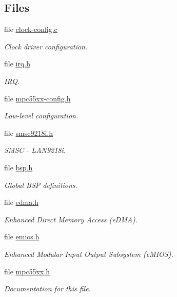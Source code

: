 \subsection*{Files}
\begin{DoxyCompactItemize}
\item 
file \mbox{\hyperlink{mpc55xxevb_2clock_2clock-config_8c}{clock-\/config.\+c}}
\begin{DoxyCompactList}\small\item\em Clock driver configuration. \end{DoxyCompactList}\item 
file \mbox{\hyperlink{bsps_2powerpc_2mpc55xxevb_2include_2bsp_2irq_8h}{irq.\+h}}
\begin{DoxyCompactList}\small\item\em I\+RQ. \end{DoxyCompactList}\item 
file \mbox{\hyperlink{mpc55xx-config_8h}{mpc55xx-\/config.\+h}}
\begin{DoxyCompactList}\small\item\em Low-\/level configuration. \end{DoxyCompactList}\item 
file \mbox{\hyperlink{smsc9218i_8h}{smsc9218i.\+h}}
\begin{DoxyCompactList}\small\item\em S\+M\+SC -\/ L\+A\+N9218i. \end{DoxyCompactList}\item 
file \mbox{\hyperlink{bsps_2powerpc_2mpc55xxevb_2include_2bsp_8h}{bsp.\+h}}
\begin{DoxyCompactList}\small\item\em Global B\+SP definitions. \end{DoxyCompactList}\item 
file \mbox{\hyperlink{edma_8h}{edma.\+h}}
\begin{DoxyCompactList}\small\item\em Enhanced Direct Memory Access (e\+D\+MA). \end{DoxyCompactList}\item 
file \mbox{\hyperlink{emios_8h}{emios.\+h}}
\begin{DoxyCompactList}\small\item\em Enhanced Modular Input Output Subsystem (e\+M\+I\+OS). \end{DoxyCompactList}\item 
file \mbox{\hyperlink{mpc55xx_8h}{mpc55xx.\+h}}
\begin{DoxyCompactList}\small\item\em Documentation for this file. \end{DoxyCompactList}\item 

\end{DoxyCompactItemize}

